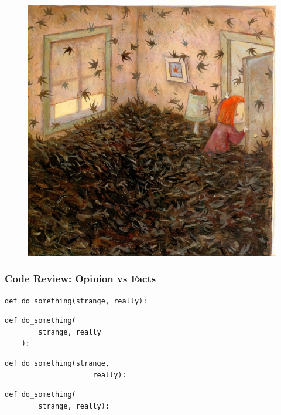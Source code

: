 \documentclass[10pt,pdf,utf8,aspectratio=169,xcolor=dvipsnames,x11names,center]{beamer}
\begin{document}
\begin{frame}
  \begin{figure}
    \includegraphics[scale=0.6]{redtree}
  \end{figure}
\end{frame}

\begin{frame}[fragile]
  \frametitle{Code Review: Opinion vs Facts}
  \begin{lstlisting}[caption=D]
    def do_something(strange, really):
  \end{lstlisting}

  \begin{lstlisting}[caption=D]
    def do_something(
        strange, really
    ):
  \end{lstlisting}

  \begin{lstlisting}[caption=D]
    def do_something(strange,
                     really):
  \end{lstlisting}

  \begin{lstlisting}[caption=D]
    def do_something(
        strange, really):
  \end{lstlisting}

\end{frame}
\end{document}
